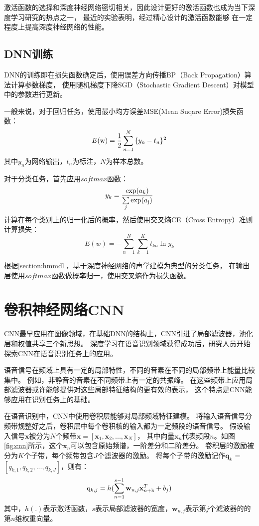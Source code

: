 激活函数的选择和深度神经网络密切相关，因此设计更好的激活函数也成为当下深度学习研究的热点之一，
最近的实验表明，经过精心设计的激活函数能够
在一定程度上提高深度神经网络的性能。

\subsection{DNN训练}

DNN的训练即在损失函数确定后，使用误差方向传播BP（Back Propagation）算法计算参数梯度，
使用随机梯度下降SGD（Stochastic Gradient Descent）对模型中的参数进行更新。

一般来说，对于回归任务，使用最小均方误差MSE(Mean Suqare Error)损失函数：
\begin{equation}
E({\rm{w}}) = \frac{1}{2}\sum\limits_{n = 1}^N {\{ {y_n}}  - {t_n}{\} ^2}
\end{equation}
其中$y_n$为网络输出，$t_n$为标注，$N$为样本总数。

对于分类任务，首先应用$softmax$函数：
\begin{equation}
{y_k} = \frac{{\exp ({a_k})}}{{\sum\limits_j {\exp ({a_{\rm{j}}})} }}
\end{equation}
计算在每个类别上的归一化后的概率，然后使用交叉熵CE（Cross Entropy）准则计算损失：
\begin{equation}
E(w) =  - \sum\limits_{n = 1}^N {\sum\limits_{k = 1}^K {{t_{kn}}\ln {y_k}} }
\end{equation}

根据\ref{section:hmmdl}，基于深度神经网络的声学建模为典型的分类任务，
在输出层使用$softmax$函数做概率归一，使用交叉熵作为损失函数。

\section{卷积神经网络CNN}

CNN最早应用在图像领域，在基础DNN的结构上，CNN引进了局部滤波器，池化层和权值共享三个新思想。
深度学习在语音识别领域获得成功后，研究人员开始探索CNN在语音识别任务上的应用。

语音信号在频域上具有一定的局部特性，不同的音素在不同的局部频带上能量比较集中。
例如，非静音的音素在不同频带上有一定的共振峰。
在这些频带上应用局部滤波器或许能够提供对这些局部特征结构的更有效的表示，
这个特点是CNN能够应用在识别任务上的基础。

在语音识别中，CNN中使用卷积层能够对局部频域特征建模。
将输入语音信号分频带规整好之后，卷积层中每个卷积核的输入都为一定频段的语音信号。
假设输入信号$\textbf{x}$被分为$N$个频带$\textbf{x}= [\textbf{x}_1, \textbf{x}_2, ..., \textbf{x}_N]$，
其中向量$\textbf{x}_n$代表频段$n$。如图\ref{fig:cnn}所示，这个$\textbf{x}_n$可以包含原始频谱，一阶差分和二阶差分。
卷积层的激励被分为$K$个子带，每个频带包含$J$个滤波器的激励。
将每个子带的激励记作$\textbf{q}_k$ = $[q_{k,1}, q_{k,2}, ..., q_{k, J}]$，则有：
\begin{equation}
{{\rm{q}}_{k,j}} = h(\sum\limits_{n = 1}^{s - 1} {{\textbf{w}_{n,j}}\textbf{x}_{n{\rm{ + k}}}^T + {b_j})}
\end{equation}
其中，$h(.)$表示激活函数，$s$表示局部滤波器的宽度，$\textbf{w}_{n,j}$表示第$j$个滤波器的的第$n$维权重向量。


